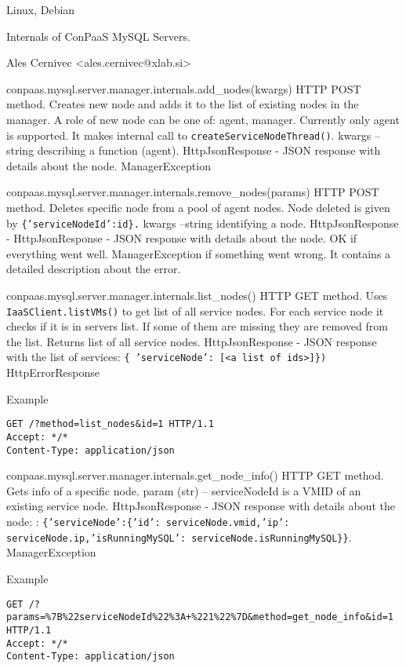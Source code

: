 \documentclass[a4paper,10pt]{article}
\begin{document}
Linux, Debian

Internals of ConPaaS MySQL Servers.

Ales Cernivec <ales.cernivec@xlab.si>
      
\vspace{10pt}

\noindent\conapi
{conpaas.mysql.server.manager.internals.add\_nodes(kwargs)}
{HTTP POST method. Creates new node and adds it to the list of existing nodes in the manager. A role of new node can be one of: agent, manager. Currently only agent is supported. It makes internal call to {\tt createServiceNodeThread()}.}
{kwargs -- string describing a function (agent).}
{HttpJsonResponse - JSON response with details about the node.}
{ManagerException}

\noindent\conapi
{ conpaas.mysql.server.manager.internals.remove\_nodes(params)}
{HTTP POST method. Deletes specific node from a pool of agent nodes. Node deleted is given by {\tt \{'serviceNodeId':id\}.}}
{kwargs --string identifying a node.}
{HttpJsonResponse - HttpJsonResponse - JSON response with details about the node. OK if everything went well. }
{ManagerException if something went wrong. It contains a detailed description about the error.}

\noindent\conapi
{ conpaas.mysql.server.manager.internals.list\_nodes()}
{ HTTP GET method. Uses {\tt IaaSClient.listVMs()} to get list of all service nodes. For each service node it checks if it is in servers list. If some of them are missing they are removed from the list. Returns list of all service nodes.}
{}
{HttpJsonResponse - JSON response with the list of services: {\tt \{ 'serviceNode': [<a list of ids>]\})}}
{HttpErrorResponse}

Example
\begin{verbatim}
GET /?method=list_nodes&id=1 HTTP/1.1
Accept: */*
Content-Type: application/json
\end{verbatim}

\noindent\conapi
{ conpaas.mysql.server.manager.internals.get\_node\_info()}
{HTTP GET method. Gets info of a specific node.}
{param (str) -- serviceNodeId is a VMID of an existing service node.}
{HttpJsonResponse - JSON response with details about the node: : {\tt \{'serviceNode':\{'id': serviceNode.vmid,'ip': serviceNode.ip,'isRunningMySQL': serviceNode.isRunningMySQL\}\}}.}
{ManagerException}

Example
\begin{verbatim}
GET /?params=%7B%22serviceNodeId%22%3A+%221%22%7D&method=get_node_info&id=1 HTTP/1.1
Accept: */*
Content-Type: application/json
\end{verbatim}
\end{document}
